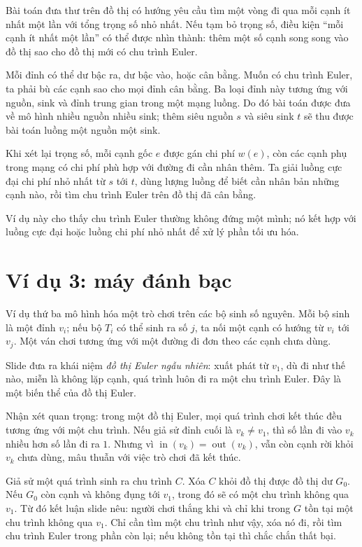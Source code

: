 \documentclass[11pt]{article}
\newcommand{\indeg}{\operatorname{in}}
\newcommand{\outdeg}{\operatorname{out}}
\begin{document}
Bài toán đưa thư trên đồ thị có hướng yêu cầu tìm một vòng đi qua mỗi cạnh ít
nhất một lần với tổng trọng số nhỏ nhất. Nếu tạm bỏ trọng số, điều kiện
``mỗi cạnh ít nhất một lần'' có thể được nhìn thành: thêm một số cạnh song
song vào đồ thị sao cho đồ thị mới có chu trình Euler.

Mỗi đỉnh có thể dư bậc ra, dư bậc vào, hoặc cân bằng. Muốn có chu trình Euler,
ta phải bù các cạnh sao cho mọi đỉnh cân bằng. Ba loại đỉnh này tương ứng với
nguồn, sink và đỉnh trung gian trong một mạng luồng. Do đó bài toán được đưa
về mô hình nhiều nguồn nhiều sink; thêm siêu nguồn \(s\) và siêu sink \(t\) sẽ
thu được bài toán luồng một nguồn một sink.

Khi xét lại trọng số, mỗi cạnh gốc \(e\) được gán chi phí \(w(e)\), còn các
cạnh phụ trong mạng có chi phí phù hợp với đường đi cần nhân thêm. Ta giải
luồng cực đại chi phí nhỏ nhất từ \(s\) tới \(t\), dùng lượng luồng để biết
cần nhân bản những cạnh nào, rồi tìm chu trình Euler trên đồ thị đã cân bằng.

Ví dụ này cho thấy chu trình Euler thường không đứng một mình; nó kết hợp với
luồng cực đại hoặc luồng chi phí nhỏ nhất để xử lý phần tối ưu hóa.

\section{Ví dụ 3: máy đánh bạc}

Ví dụ thứ ba mô hình hóa một trò chơi trên các bộ sinh số nguyên. Mỗi bộ sinh
là một đỉnh \(v_i\); nếu bộ \(T_i\) có thể sinh ra số \(j\), ta nối một cạnh
có hướng từ \(v_i\) tới \(v_j\). Một ván chơi tương ứng với một đường đi đơn
theo các cạnh chưa dùng.

Slide đưa ra khái niệm \emph{đồ thị Euler ngẫu nhiên}: xuất phát từ \(v_1\),
dù đi như thế nào, miễn là không lặp cạnh, quá trình luôn đi ra một chu trình
Euler. Đây là một biến thể của đồ thị Euler.

Nhận xét quan trọng: trong một đồ thị Euler, mọi quá trình chơi kết thúc đều
tương ứng với một chu trình. Nếu giả sử đỉnh cuối là \(v_k\ne v_1\), thì số
lần đi vào \(v_k\) nhiều hơn số lần đi ra \(1\). Nhưng vì \(\indeg(v_k)=
\outdeg(v_k)\), vẫn còn cạnh rời khỏi \(v_k\) chưa dùng, mâu thuẫn với việc
trò chơi đã kết thúc.

Giả sử một quá trình sinh ra chu trình \(C\). Xóa \(C\) khỏi đồ thị được đồ
thị dư \(G_0\). Nếu \(G_0\) còn cạnh và không đụng tới \(v_1\), trong đó sẽ có
một chu trình không qua \(v_1\). Từ đó kết luận slide nêu: người chơi thắng
khi và chỉ khi trong \(G\) tồn tại một chu trình không qua \(v_1\). Chỉ cần
tìm một chu trình như vậy, xóa nó đi, rồi tìm chu trình Euler trong phần còn
lại; nếu không tồn tại thì chắc chắn thất bại.
\end{document}
